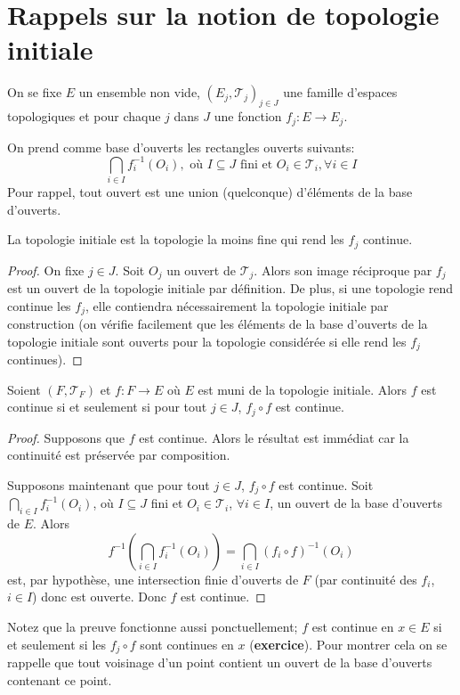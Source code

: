\section{Rappels sur la notion de topologie initiale}
On se fixe $E$ un ensemble non vide, $(E_j, \mathcal{T}_j)_{j\in J}$ une famille
d'espaces topologiques et pour chaque $j$ dans $J$ une fonction
$f_j: E\to E_j$.
\begin{df}\label{init:df}
  On prend comme base d'ouverts les \og rectangles
  ouverts \fg{} suivants:
  \begin{equation*}
    \bigcap_{i\in I}f^{-1}_i(O_i), \mbox{ où }I\subseteq J \mbox{ fini et }
    O_i\in\mathcal{T}_i, \forall i \in I
  \end{equation*}
  Pour rappel, tout ouvert est une union (quelconque) d'éléments
  de la base d'ouverts.
\end{df}

\begin{prop}
  La topologie initiale est la topologie la moins fine
  qui rend les $f_j$ continue.
\end{prop}

\begin{proof}
  On fixe $j\in J$. Soit $O_j$ un ouvert de $\mathcal{T}_j$.
  Alors son image réciproque par $f_j$ est un ouvert
  de la topologie initiale par définition. De plus,
  si une topologie rend continue les $f_j$, elle
  contiendra nécessairement la topologie initiale
  par construction (on vérifie facilement que les
  éléments de la base d'ouverts  de la topologie initiale
  sont ouverts pour la topologie considérée si elle
  rend les $f_j$ continues).
\end{proof}

\begin{prop}\label{init:cont}
  Soient $(F, \mathcal{T}_F)$ et $f: F\to E$ où $E$ est
  muni de la topologie initiale. Alors $f$ est
  continue si et seulement si pour tout $j\in J$,
  $f_j\circ f$ est continue.
\end{prop}

\begin{proof}
  Supposons que $f$ est continue. Alors le résultat est
  immédiat car la continuité est préservée par composition.

  Supposons maintenant que pour tout $j\in J$, $f_j\circ f$
  est continue. Soit $\bigcap_{i\in I}f^{-1}_i(O_i)$,
  où $I\subseteq J$ fini et $O_i\in\mathcal{T}_i$, $\forall i \in I$,
  un ouvert de la base d'ouverts de $E$. Alors
  $$f^{-1}\left(\bigcap_{i\in I}f^{-1}_i(O_i)\right) =
  \bigcap_{i\in I} \left(f_i\circ f\right)^{-1}(O_i)$$
  est, par hypothèse, une intersection finie d'ouverts
  de $F$ (par continuité des $f_i$, $i\in I$) donc est
  ouverte. Donc $f$ est continue.
\end{proof}
Notez que la preuve fonctionne aussi ponctuellement;
$f$ est continue en $x\in E$ si et seulement si
les $f_j\circ f$ sont continues en $x$ (\textbf{exercice}).
Pour montrer cela
on se rappelle que tout voisinage d'un point contient
un ouvert de la base d'ouverts contenant ce point.

